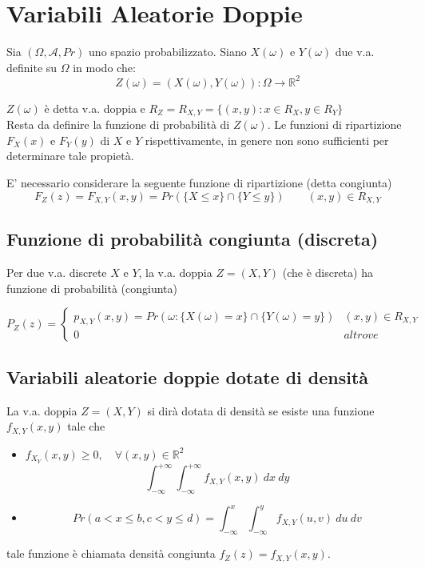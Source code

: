 \documentclass[a4paper]{report}
\begin{document}
  \chapter{Variabili Aleatorie Doppie}
  Sia $(\Omega, \mathcal{A}, Pr)$ uno spazio probabilizzato. Siano $X(\omega)$ e $Y(\omega)$ due v.a. definite su $\Omega$ in modo che:
  \[ Z(\omega) = (X(\omega),Y(\omega)) : \Omega \rightarrow \mathbb{R}^2 \]

    $Z(\omega)$ è detta v.a. doppia e $R_Z = R_{X,Y} = \{(x,y):x \in R_X,y \in R_Y\}$\\

  Resta da definire la funzione di probabilità di $Z(\omega)$. Le funzioni di ripartizione $F_X(x)$ e $F_Y(y)$ di $X$ e $Y$ rispettivamente, in genere non sono sufficienti per determinare tale propietà.

    E' necessario considerare la seguente funzione di ripartizione (detta congiunta)
  \[ F_Z(z) = F_{X,Y}(x,y) = Pr(\{ X \leqslant x\} \cap \{ Y \leqslant y \}) \quad\quad (x,y)\in R_{X,Y} \]

  \section{Funzione di probabilità congiunta (discreta)}
  Per due v.a. discrete $X$ e $Y$, la v.a. doppia $Z=(X,Y)$ (che è discreta) ha funzione di probabilità (congiunta)

  \[
    P_Z(z) =
    \begin{cases}
      p_{X,Y}(x,y) = Pr(\omega : \{ X(\omega) = x \} \cap \{ Y(\omega) = y \}) & (x,y) \in R_{X,Y}\\
      0 & altrove
    \end{cases}
  \]

  \section{Variabili aleatorie doppie dotate di densità}
  La v.a. doppia $Z= (X,Y)$ si dirà dotata di densità se esiste una funzione $f_{X,Y}(x,y)$ tale che
  \begin{itemize}
    \item $f_{X_Y}(x,y) \geq 0, \quad \forall (x,y) \in \mathbb{R}^2$
    \[ \int_{-\infty}^{+\infty}\int_{-\infty}^{+\infty} f_{X,Y}(x,y)\: dx\: dy \]
    \item \[Pr(a < x \leqslant b, c < y \leqslant d) = \int_{-\infty}^{x}\int_{-\infty}^{y} f_{X,Y}(u,v)\: du\: dv \]

  \end{itemize}
  tale funzione è chiamata densità congiunta $f_Z(z) = f_{X,Y}(x,y)$.
\end{document}
